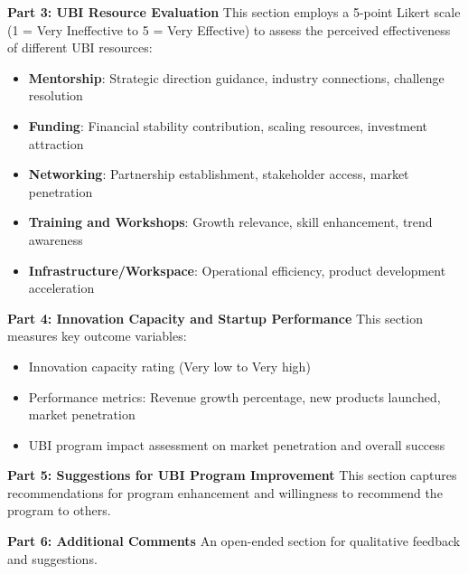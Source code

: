 \documentclass[../Main.tex]{subfiles}%
\begin{document}
	\textbf{Part 3: UBI Resource Evaluation}
	This section employs a 5-point Likert scale (1 = Very Ineffective to 5 = Very Effective) to assess the perceived effectiveness of different UBI resources:
	\begin{itemize}
		\item \textbf{Mentorship}: Strategic direction guidance, industry connections, challenge resolution
		\item \textbf{Funding}: Financial stability contribution, scaling resources, investment attraction
		\item \textbf{Networking}: Partnership establishment, stakeholder access, market penetration
		\item \textbf{Training and Workshops}: Growth relevance, skill enhancement, trend awareness
		\item \textbf{Infrastructure/Workspace}: Operational efficiency, product development acceleration
	\end{itemize}
	
	\textbf{Part 4: Innovation Capacity and Startup Performance}
	This section measures key outcome variables:
	\begin{itemize}
		\item Innovation capacity rating (Very low to Very high)
		\item Performance metrics: Revenue growth percentage, new products launched, market penetration
		\item UBI program impact assessment on market penetration and overall success
	\end{itemize}
	
	\textbf{Part 5: Suggestions for UBI Program Improvement}
	This section captures recommendations for program enhancement and willingness to recommend the program to others.
	
	\textbf{Part 6: Additional Comments}
	An open-ended section for qualitative feedback and suggestions.
	
\end{document}
